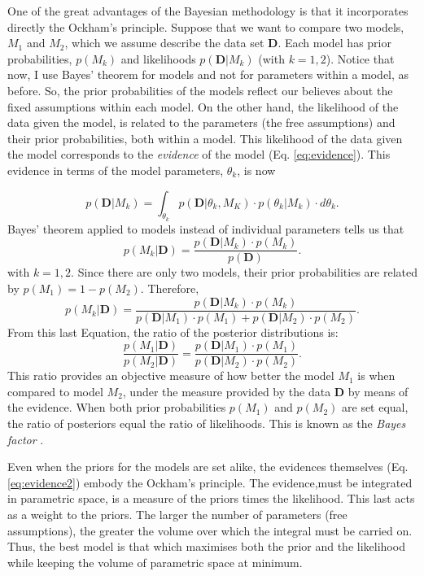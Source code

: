 One of the great advantages of the Bayesian methodology is that it incorporates directly the Ockham's principle. Suppose that we want to compare two models, $M_1$ and $M_2$, which we assume describe the data set $\mathbf{D}$. Each model has prior probabilities, $p(M_k)$ and likelihoods $p(\mathbf{D}|M_k)$ (with $k=1,2$). Notice that now, I use Bayes' theorem for models and not for parameters within a model, as before. So, the prior probabilities of the models reflect our believes about the fixed assumptions within each model. On the other hand, the likelihood of the data given the model, is related to the parameters (the free assumptions) and their prior probabilities, both within a model. This likelihood of the data given the model corresponds to the \emph{evidence} of the model (Eq. \ref{eq:evidence}). This evidence in terms of the model parameters, $\theta_k$, is now

 \begin{equation}
p(\mathbf{D}|M_k)=\int_{\theta_k} p(\mathbf{D}|\theta_k,M_K)\cdot p(\theta_k|M_k)\cdot d\theta_k. \label{eq:evidence2}
\end{equation}
Bayes' theorem applied to models instead of individual parameters tells us that
\begin{equation}
p(M_k|\mathbf{D})=\frac{p(\mathbf{D}|M_k)\cdot p(M_k)}{p(\mathbf{D})}.
\end{equation}
with $k=1,2$. Since there are only two models, their prior probabilities are related by $p(M_1)= 1- p(M_2)$. Therefore,
 \begin{equation}
p(M_k|\mathbf{D})=\frac{p(\mathbf{D}|M_k)\cdot p(M_k)}{p(\mathbf{D}|M_1)\cdot p(M_1)+p(\mathbf{D}|M_2)\cdot p(M_2)}.
\end{equation}
From this last Equation, the ratio of the posterior distributions is:
\begin{equation}
\frac{p(M_1|\mathbf{D})}{p(M_2|\mathbf{D})}=\frac{p(\mathbf{D}|M_1)\cdot p(M_1)}{p(\mathbf{D}|M_2)\cdot p(M_2)}.
\end{equation}
This ratio provides an objective measure of how better the model $M_1$ is when compared to model $M_2$, under the measure provided by the data $\mathbf{D}$ by means of the evidence. When both prior probabilities  $p(M_1)$ and $p(M_2)$ are set equal, the ratio of posteriors equal the ratio of likelihoods. This is known as the \emph{Bayes factor} \cite[for a similar derivation and some examples of its application see][]{Kaas1995}. 

Even when the priors for the models are set alike, the evidences themselves (Eq. \ref{eq:evidence2}) embody the Ockham's principle. The evidence,must be integrated in parametric space, is a measure of the priors times the likelihood. This last acts as a weight to the priors.  The larger the number of parameters (free assumptions), the greater the volume over which the integral must be carried on. Thus, the best model is that which maximises both the prior and the likelihood while keeping the volume of parametric space at minimum.

